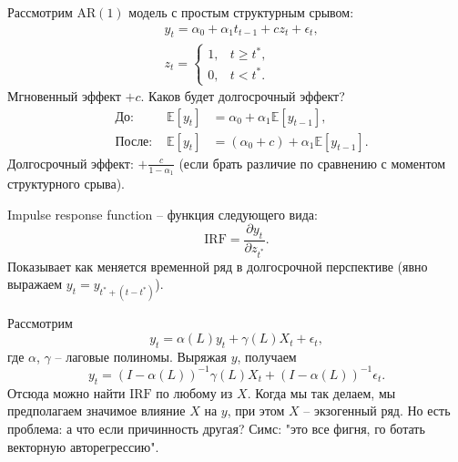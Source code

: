         Рассмотрим $\mathrm{AR}(1)$ модель с простым структурным срывом:
        \begin{align}
            & y_t = \alpha_0 + \alpha_1 t_{t-1} + c z_t + \epsilon_t, \\
            & z_t = \begin{cases}
                1,& t\geq t^*,\\
                0,& t<t^*.
            \end{cases}
        \end{align}
        Мгновенный эффект $+c$. Каков будет долгосрочный эффект? 
        \begin{align}
            & \text{До: }&\mathbb{E} \left[y_t\right] &= \alpha_0 + \alpha_1 \mathbb{E} \left[y_{t-1}\right], \\
            & \text{После: }&\mathbb{E} \left[y_t\right] &= (\alpha_0+c) + \alpha_1 \mathbb{E} \left[y_{t-1}\right].
        \end{align}
        Долгосрочный эффект: $+\frac{c}{1-\alpha_1}$ (если брать различие по сравнению с моментом структурного срыва).
        \begin{definition}
            Impulse response function -- функция следующего вида:
            \begin{equation*}
                \mathrm{IRF} = \frac{\partial y_t}{\partial z_{t^*}}.
            \end{equation*} 
            Показывает как меняется временной ряд в долгосрочной перспективе (явно выражаем $y_t = y_{t^*+(t-t^*)}$).
        \end{definition}
        Рассмотрим 
        \begin{equation}
            y_t = \alpha(L) y_t + \gamma(L)X_t + \epsilon_t,
        \end{equation}
        где $\alpha$, $\gamma$ -- лаговые полиномы.
        Выряжая $y$, получаем 
        \begin{equation}
             y_t = (I - \alpha(L))^{-1} \gamma(L)X_t + (I - \alpha(L))^{-1} \epsilon_t.
        \end{equation}
        Отсюда можно найти $\mathrm{IRF}$ по любому из $X$. Когда мы так делаем, мы предполагаем значимое влияние $X$ на $y$, 
        при этом $X$ -- экзогенный ряд. Но есть проблема: а что если причинность другая? Симс: "это все фигня, го ботать векторную авторегрессию".

